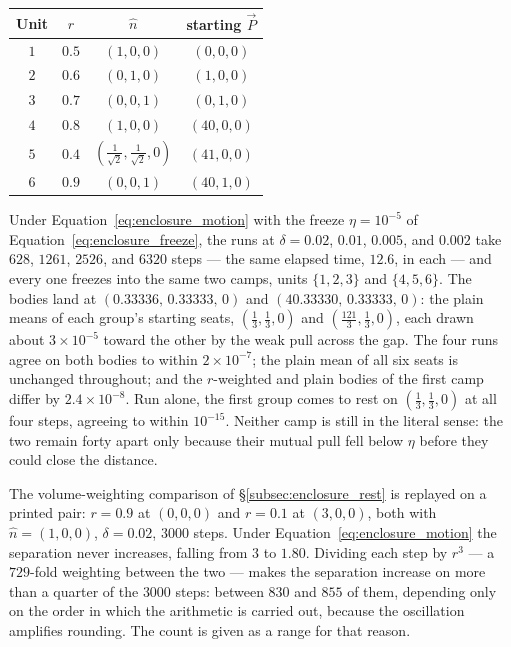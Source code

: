 \documentclass[12pt, a4paper]{article}
\begin{document}
\begin{center}
\begin{tabular}{cccc}
Unit & $r$ & $\hat n$ & starting $\vec P$ \\
\hline
$1$ & $0.5$ & $(1,0,0)$ & $(0,0,0)$ \\
$2$ & $0.6$ & $(0,1,0)$ & $(1,0,0)$ \\
$3$ & $0.7$ & $(0,0,1)$ & $(0,1,0)$ \\
$4$ & $0.8$ & $(1,0,0)$ & $(40,0,0)$ \\
$5$ & $0.4$ & $(\tfrac{1}{\sqrt2},\tfrac{1}{\sqrt2},0)$ & $(41,0,0)$ \\
$6$ & $0.9$ & $(0,0,1)$ & $(40,1,0)$ \\
\end{tabular}
\end{center}

Under Equation~\eqref{eq:enclosure_motion} with the freeze
$\eta=10^{-5}$ of Equation~\eqref{eq:enclosure_freeze}, the runs at
$\delta=0.02$, $0.01$, $0.005$, and $0.002$ take $628$, $1261$,
$2526$, and $6320$ steps --- the same elapsed time, $12.6$, in each
--- and every one freezes into the same two camps, units $\{1,2,3\}$
and $\{4,5,6\}$. The bodies land at
$(0.33336,\,0.33333,\,0)$ and $(40.33330,\,0.33333,\,0)$: the plain
means of each group's starting seats, $(\tfrac13,\tfrac13,0)$ and
$(\tfrac{121}{3},\tfrac13,0)$, each drawn about $3\times10^{-5}$
toward the other by the weak pull across the gap. The four runs agree
on both bodies to within $2\times10^{-7}$; the plain mean of all six
seats is unchanged throughout; and the $r$-weighted and plain bodies
of the first camp differ by $2.4\times10^{-8}$. Run alone, the first
group comes to rest on $(\tfrac13,\tfrac13,0)$ at all four steps,
agreeing to within $10^{-15}$. Neither camp is still in the
literal sense: the two remain forty apart only because their mutual
pull fell below $\eta$ before they could close the distance.

The volume-weighting comparison of \S\ref{subsec:enclosure_rest} is
replayed on a printed pair: $r=0.9$ at $(0,0,0)$ and $r=0.1$ at
$(3,0,0)$, both with $\hat n=(1,0,0)$, $\delta=0.02$, $3000$ steps.
Under Equation~\eqref{eq:enclosure_motion} the separation never
increases, falling from $3$ to $1.80$. Dividing each step by $r^3$ ---
a $729$-fold weighting between the two --- makes the separation increase on more than a quarter of the $3000$ steps: between $830$ and $855$ of them, depending only on the order in which the arithmetic is carried out, because the oscillation amplifies rounding. The count is given as a range for that reason.
\end{document}
